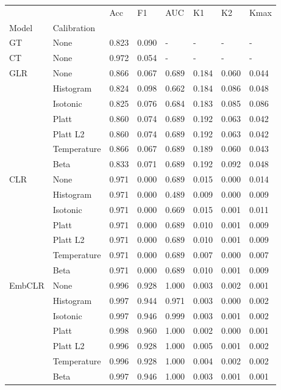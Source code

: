 \begin{tabular}{llllllll}
\toprule
 &  & Acc & F1 & AUC & K1 & K2 & Kmax \\
Model & Calibration &  &  &  &  &  &  \\
\midrule
GT & None & 0.823 & 0.090 & - & - & - & - \\
\cline{1-8}
CT & None & 0.972 & 0.054 & - & - & - & - \\
\cline{1-8}
\multirow[t]{7}{*}{GLR} & None & 0.866 & 0.067 & 0.689 & 0.184 & 0.060 & 0.044 \\
 & Histogram & 0.824 & 0.098 & 0.662 & 0.184 & 0.086 & 0.048 \\
 & Isotonic & 0.825 & 0.076 & 0.684 & 0.183 & 0.085 & 0.086 \\
 & Platt & 0.860 & 0.074 & 0.689 & 0.192 & 0.063 & 0.042 \\
 & Platt L2 & 0.860 & 0.074 & 0.689 & 0.192 & 0.063 & 0.042 \\
 & Temperature & 0.866 & 0.067 & 0.689 & 0.189 & 0.060 & 0.043 \\
 & Beta & 0.833 & 0.071 & 0.689 & 0.192 & 0.092 & 0.048 \\
\cline{1-8}
\multirow[t]{7}{*}{CLR} & None & 0.971 & 0.000 & 0.689 & 0.015 & 0.000 & 0.014 \\
 & Histogram & 0.971 & 0.000 & 0.489 & 0.009 & 0.000 & 0.009 \\
 & Isotonic & 0.971 & 0.000 & 0.669 & 0.015 & 0.001 & 0.011 \\
 & Platt & 0.971 & 0.000 & 0.689 & 0.010 & 0.001 & 0.009 \\
 & Platt L2 & 0.971 & 0.000 & 0.689 & 0.010 & 0.001 & 0.009 \\
 & Temperature & 0.971 & 0.000 & 0.689 & 0.007 & 0.000 & 0.007 \\
 & Beta & 0.971 & 0.000 & 0.689 & 0.010 & 0.001 & 0.009 \\
\cline{1-8}
\multirow[t]{7}{*}{EmbCLR} & None & 0.996 & 0.928 & 1.000 & 0.003 & 0.002 & 0.001 \\
 & Histogram & 0.997 & 0.944 & 0.971 & 0.003 & 0.000 & 0.002 \\
 & Isotonic & 0.997 & 0.946 & 0.999 & 0.003 & 0.001 & 0.002 \\
 & Platt & 0.998 & 0.960 & 1.000 & 0.002 & 0.000 & 0.001 \\
 & Platt L2 & 0.996 & 0.928 & 1.000 & 0.005 & 0.001 & 0.002 \\
 & Temperature & 0.996 & 0.928 & 1.000 & 0.004 & 0.002 & 0.002 \\
 & Beta & 0.997 & 0.946 & 1.000 & 0.003 & 0.001 & 0.001 \\
\cline{1-8}
\bottomrule
\end{tabular}

